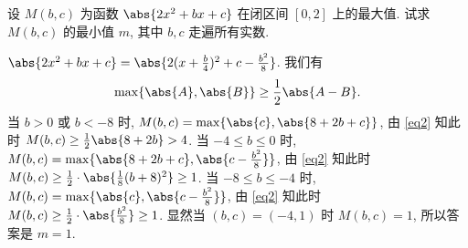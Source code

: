 \begin{prob}
\label{prob:prob-15}
设 $M(b,c)$ 为函数 $\abs{2x^2 + bx + c}$ 在闭区间 $[0,2]$ 上的最大值.
试求 $M(b,c)$ 的最小值 $m$, 其中 $b,c$ 走遍所有实数.
\end{prob}

\begin{soln}
$\abs{2x^2 + bx + c} = \abs{2(x + \frac{b}{4})^2 + c - \frac{b^2}{8}}$.
我们有
\begin{equation}
\label{eq2}
\max\{\abs{A},\abs{B}\} \ge \frac{1}{2}\abs{A-B}.
\end{equation}
当 $b > 0$ 或 $b < -8$ 时, $M(b,c) = \max\{\abs{c}, \abs{8+2b+c}\}$,
由 \cref{eq2} 知此时 $M(b,c) \ge \frac{1}{2}\abs{8+2b} > 4$.
当 $-4 \le b \le 0$ 时, $M(b,c) = \max\{\abs{8+2b+c},\abs{c-\frac{b^2}{8}}\}$,
由 \cref{eq2} 知此时 $M(b,c) \ge \frac{1}{2}\cdot \abs{\frac{1}{8}(b+8)^2} \ge 1$.
当 $-8\le b \le -4$ 时, $M(b,c) = \max\{\abs{c}, \abs{c-\frac{b^2}{8}}\}$,
由 \cref{eq2} 知此时 $M(b,c) \ge \frac{1}{2}\cdot \abs{\frac{b^2}{8}} \ge 1$.
显然当 $(b,c) = (-4,1)$ 时 $M(b,c) = 1$, 所以答案是 $\boxed{m = 1.}$
\end{soln}
